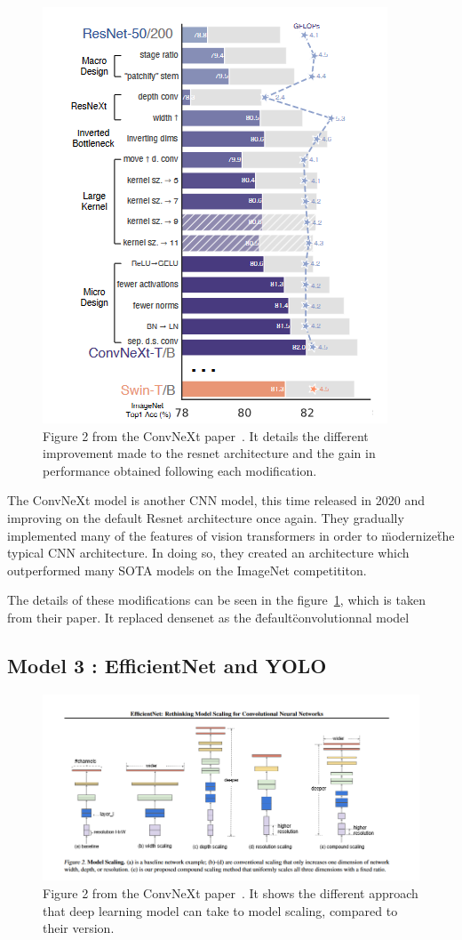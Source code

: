 \documentclass[11pt]{article}
\begin{document}
\begin{figure}[H]

     \centering
     \includegraphics[width=0.5 \textwidth]{plots/convnext_graph}
     \caption{Figure 2 from the ConvNeXt paper~\cite{convnext}. It details the different improvement made to the
     resnet architecture and the gain in performance obtained following each modification.}
     \label{fig:convnext}

\end{figure}

        The ConvNeXt model is another CNN model, this time released in 2020 and improving on the default Resnet architecture once again.
        They gradually implemented many of the features of vision transformers in order to \"modernize\" the typical
        CNN architecture. In doing so, they created an architecture which outperformed many SOTA models on the ImageNet competititon.

        The details of these modifications can be seen in the figure~\ref{fig:convnext}, which is taken from their paper.
        It replaced densenet as the \"default\" convolutionnal model


    \subsection{Model 3 : EfficientNet and YOLO}


\begin{figure}[H]

     \centering
     \includegraphics[width=0.8 \textwidth]{plots/efficientnet}
     \caption{Figure 2 from the ConvNeXt paper~\cite{efficientnet}. It shows the different approach that deep learning
     model can take to model scaling, compared to their version.}
     \label{fig:efficientnet}

\end{figure}
\end{document}
